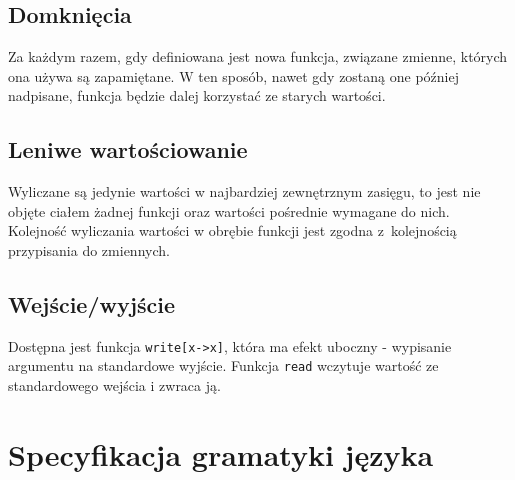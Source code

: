 \documentclass[4paper,10pt]{article}
\begin{document}
\subsection{Domknięcia}
Za każdym razem, gdy definiowana jest nowa funkcja, związane zmienne, których ona używa są zapamiętane.
W ten sposób, nawet gdy zostaną one później nadpisane, funkcja będzie dalej korzystać ze starych wartości.

\subsection{Leniwe wartościowanie}
Wyliczane są jedynie wartości w najbardziej zewnętrznym zasięgu, to jest nie objęte ciałem żadnej funkcji oraz wartości pośrednie wymagane do nich.
Kolejność wyliczania wartości w obrębie funkcji jest zgodna z~kolejnością przypisania do zmiennych.


\subsection{Wejście/wyjście}
Dostępna jest funkcja \texttt{write[x->x]}, która ma efekt uboczny - wypisanie argumentu na standardowe wyjście.
Funkcja \texttt{read} wczytuje wartość ze standardowego wejścia i zwraca ją.

\section{Specyfikacja gramatyki języka}
\end{document}
